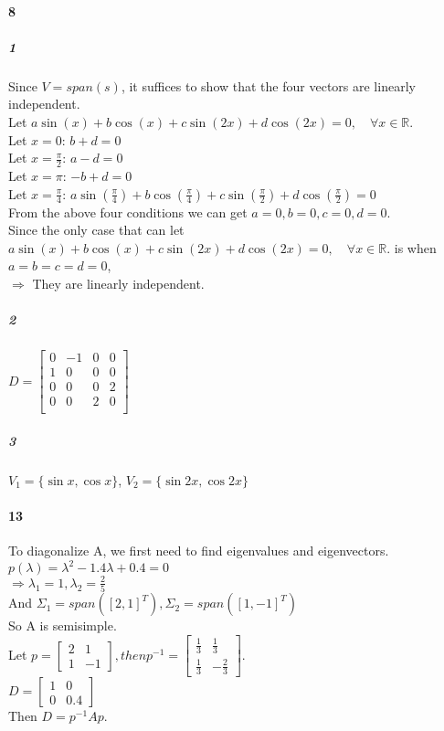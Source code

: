\documentclass[10pt,letter]{article}
\begin{document}
\paragraph{8}
\subparagraph{1} Since $V=span(s)$, it suffices to show that the four vectors are linearly independent. \\
Let $a \sin(x)+b\cos(x)+c\sin(2x)+d\cos(2x)=0,\quad \forall x\in \mathbb{R}.$\\
Let $x=0$: $b+d=0$\\
Let $x=\frac{\pi}{2}$: $a-d=0$\\
Let $x=\pi$: $-b+d=0$\\
Let $x=\frac{\pi}{4}$: $a \sin(\frac{\pi}{4})+b\cos(\frac{\pi}{4})+c\sin(\frac{\pi}{2})+d\cos(\frac{\pi}{2})=0$\\
From the above four conditions we can get $a=0, b=0, c=0, d=0$. \\
Since the only case that can let $a \sin(x)+b\cos(x)+c\sin(2x)+d\cos(2x)=0,\quad \forall x\in \mathbb{R}.$ is when $a=b=c=d=0$,\\
$\Rightarrow$ They are linearly independent.
\subparagraph{2}
$D=\begin{bmatrix}
0&-1&0&0\\
1&0&0&0\\
0&0&0&2\\
0&0&2&0\\
\end{bmatrix}$
\subparagraph{3}
$V_1=\{\sin x,\cos x\}$, $V_2=\{\sin 2x,\cos 2x\}$
\paragraph{13}
To diagonalize A, we first need to find eigenvalues and eigenvectors. \\
$p(\lambda)=\lambda^2-1.4\lambda+0.4=0$\\
$\Rightarrow \lambda_1=1, \lambda_2 = \frac{2}{5}$\\
And $\Sigma_1=span([2,1]^T), \Sigma_2=span([1,-1]^T)$\\
So A is semisimple.\\
Let $p=\begin{bmatrix}
2&1\\1&-1
\end{bmatrix}, then p^{-1}=\begin{bmatrix}
\frac{1}{3}&\frac{1}{3}\\\frac{1}{3}&-\frac{2}{3}
\end{bmatrix}$.\\
$D=\begin{bmatrix}
1&0\\0&0.4
\end{bmatrix}$\\
Then $D=p^{-1}Ap$.\\
\end{document}
